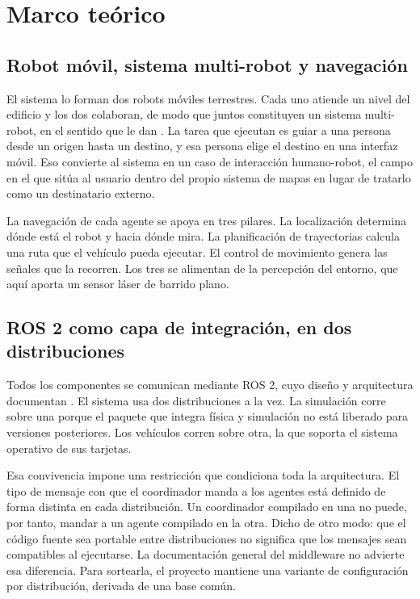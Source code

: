 \section{Marco teórico}

\subsection{Robot móvil, sistema multi-robot y navegación}

El sistema lo forman dos robots móviles terrestres. Cada uno atiende un nivel del
edificio y los dos colaboran, de modo que juntos constituyen un sistema
multi-robot, en el sentido que le dan \textcite{varghese2023multirobot}. La
tarea que ejecutan es guiar a una
persona desde un origen hasta un destino, y esa persona elige el destino en una
interfaz móvil. Eso convierte al sistema en un caso de interacción humano-robot,
el campo en el que \textcite{jimenez2024arquitectura} sitúa al usuario dentro del
propio sistema de mapas en lugar de tratarlo como un destinatario externo.

La navegación de cada agente se apoya en tres pilares. La localización determina
dónde está el robot y hacia dónde mira. La planificación de trayectorias calcula
una ruta que el vehículo pueda ejecutar. El control de movimiento genera las
señales que la recorren. Los tres se alimentan de la percepción del entorno, que
aquí aporta un sensor láser de barrido plano.

\subsection{ROS 2 como capa de integración, en dos distribuciones}

Todos los componentes se comunican mediante ROS 2, cuyo diseño y arquitectura
documentan \textcite{macenski2022ros2}. El
sistema usa dos distribuciones a la vez. La simulación corre sobre una porque el
paquete que integra física y simulación no está liberado para versiones
posteriores. Los vehículos corren sobre otra, la que soporta el sistema operativo
de sus tarjetas.

Esa convivencia impone una restricción que condiciona toda la arquitectura. El
tipo de mensaje con que el coordinador manda a los agentes está definido de forma
distinta en cada distribución. Un coordinador compilado en una no puede, por
tanto, mandar a un agente compilado en la otra. Dicho de otro modo: que el código
fuente sea portable entre distribuciones no significa que los mensajes sean
compatibles al ejecutarse. La documentación general del middleware no advierte
esa diferencia. Para sortearla, el proyecto mantiene una variante de
configuración por distribución, derivada de una base común.

